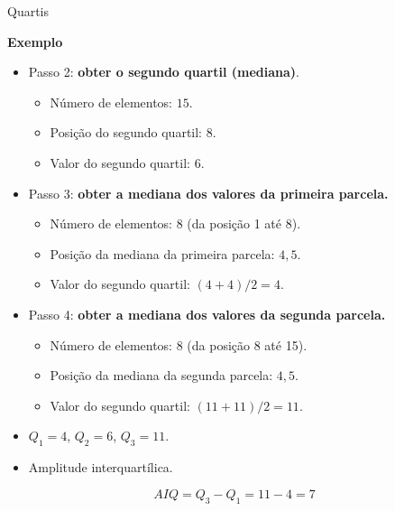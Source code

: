 \documentclass[
  ignorenonframetext,
  serif,
  professionalfont,
  usenames,
  dvipsnames,
  aspectratio = 169]{beamer}
\providecommand{\tightlist}{%
  \setlength{\itemsep}{0pt}\setlength{\parskip}{0pt}}
\renewcommand{\tightlist}{%
  \setlength{\itemsep}{0\baselineskip}
  \setlength{\parskip}{0.25\baselineskip}
}
\def\beginAHalfColumn{\begin{minipage}{0.49\textwidth}}%
\def\endColumns{\end{minipage}}%
\begin{document}
\begin{frame}{Quartis}
\label{quartis-3}
\beginAHalfColumn

\textbf{Exemplo}

\begin{itemize}
\tightlist
\item
  Passo 2: \textbf{obter o segundo quartil (mediana)}.

  \begin{itemize}
  \tightlist
  \item
    Número de elementos: \(15\).
  \item
    Posição do segundo quartil: \(8\).
  \item
    Valor do segundo quartil: \(6\).
  \end{itemize}
\item
  Passo 3: \textbf{obter a mediana dos valores da primeira parcela.}

  \begin{itemize}
  \tightlist
  \item
    Número de elementos: \(8\) (da posição 1 até 8).
  \item
    Posição da mediana da primeira parcela: \(4,5\).
  \item
    Valor do segundo quartil: \((4+4)/2 = 4\).
  \end{itemize}
\end{itemize}

\endColumns
\beginAHalfColumn

\begin{itemize}
\item
  Passo 4: \textbf{obter a mediana dos valores da segunda parcela.}

  \begin{itemize}
  \tightlist
  \item
    Número de elementos: \(8\) (da posição 8 até 15).
  \item
    Posição da mediana da segunda parcela: \(4,5\).
  \item
    Valor do segundo quartil: \((11+11)/2 = 11\).
  \end{itemize}
\item
  \(Q_1 = 4\), \(Q_2 = 6\), \(Q_3 = 11\).
\item
  Amplitude interquartílica.
\end{itemize}

\[AIQ = Q_3 - Q_1 = 11 - 4 = 7\]

\endColumns
\end{frame}
\end{document}
